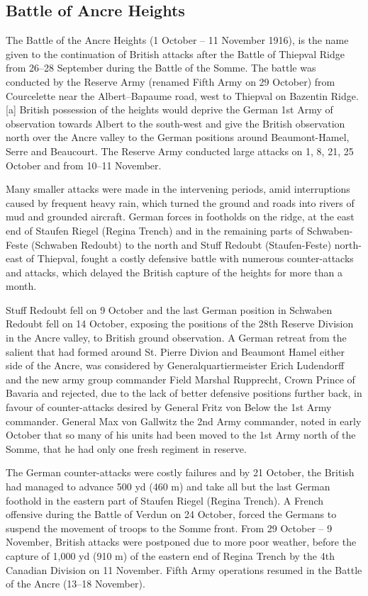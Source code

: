 \documentclass[a4paper,]{book}
\begin{document}
\subsection{Battle of Ancre Heights}

The Battle of the Ancre Heights (1 October – 11 November 1916), is the name given to the continuation of British attacks after the Battle of Thiepval Ridge from 26–28 September during the Battle of the Somme. The battle was conducted by the Reserve Army (renamed Fifth Army on 29 October) from Courcelette near the Albert–Bapaume road, west to Thiepval on Bazentin Ridge.[a] British possession of the heights would deprive the German 1st Army of observation towards Albert to the south-west and give the British observation north over the Ancre valley to the German positions around Beaumont-Hamel, Serre and Beaucourt. The Reserve Army conducted large attacks on 1, 8, 21, 25 October and from 10–11 November.

Many smaller attacks were made in the intervening periods, amid interruptions caused by frequent heavy rain, which turned the ground and roads into rivers of mud and grounded aircraft. German forces in footholds on the ridge, at the east end of Staufen Riegel (Regina Trench) and in the remaining parts of Schwaben-Feste (Schwaben Redoubt) to the north and Stuff Redoubt (Staufen-Feste) north-east of Thiepval, fought a costly defensive battle with numerous counter-attacks and attacks, which delayed the British capture of the heights for more than a month.

Stuff Redoubt fell on 9 October and the last German position in Schwaben Redoubt fell on 14 October, exposing the positions of the 28th Reserve Division in the Ancre valley, to British ground observation. A German retreat from the salient that had formed around St. Pierre Divion and Beaumont Hamel either side of the Ancre, was considered by Generalquartiermeister Erich Ludendorff and the new army group commander Field Marshal Rupprecht, Crown Prince of Bavaria and rejected, due to the lack of better defensive positions further back, in favour of counter-attacks desired by General Fritz von Below the 1st Army commander. General Max von Gallwitz the 2nd Army commander, noted in early October that so many of his units had been moved to the 1st Army north of the Somme, that he had only one fresh regiment in reserve.

The German counter-attacks were costly failures and by 21 October, the British had managed to advance 500 yd (460 m) and take all but the last German foothold in the eastern part of Staufen Riegel (Regina Trench). A French offensive during the Battle of Verdun on 24 October, forced the Germans to suspend the movement of troops to the Somme front. From 29 October – 9 November, British attacks were postponed due to more poor weather, before the capture of 1,000 yd (910 m) of the eastern end of Regina Trench by the 4th Canadian Division on 11 November. Fifth Army operations resumed in the Battle of the Ancre (13–18 November). 
\end{document}
